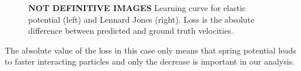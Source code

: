 \documentclass[../../master_thesis_np.tex]{subfiles}
\begin{document}
\begin{figure}[b]
	\centering
	\caption{\textbf{NOT DEFINITIVE IMAGES} Learning curve for elastic potential (left) and Lennard Jones (right). Loss is the absolute difference between predicted and ground truth velocities.}
	\label{fig:learning_curve}
\end{figure}

The absolute value of the loss in this case only means that spring potential leads to faster interacting particles and only the decrease is important in our analysis.
\end{document}
